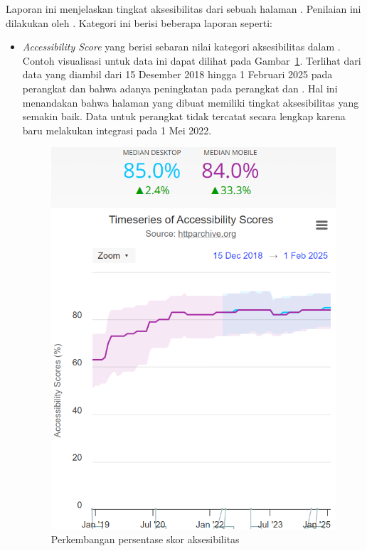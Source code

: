 Laporan ini menjelaskan tingkat aksesibilitas dari sebuah halaman \web. Penilaian ini dilakukan oleh \light. Kategori ini berisi beberapa laporan seperti:
\begin{itemize}
    \item \textit{Accessibility Score} yang berisi sebaran nilai kategori aksesibilitas dalam \light. Contoh visualisasi untuk data ini dapat dilihat pada Gambar~\ref{fig:accessscore}. Terlihat dari data yang diambil dari 15 Desember 2018 hingga 1 Februari 2025 pada perangkat \desktop dan \mobile bahwa adanya peningkatan pada perangkat \mobile dan \desktop. Hal ini menandakan bahwa halaman \web yang dibuat memiliki tingkat aksesibilitas yang semakin baik. Data untuk perangkat \desktop tidak tercatat secara lengkap karena \light baru melakukan integrasi pada 1 Mei 2022.
    \begin{figure}[H]
        \centering
        \includegraphics[width=0.4\linewidth]{Gambar/Contoh Accessibility Score.png}
        \caption{Perkembangan persentase skor aksesibilitas}
        \label{fig:accessscore}
    \end{figure}


\end{itemize}
